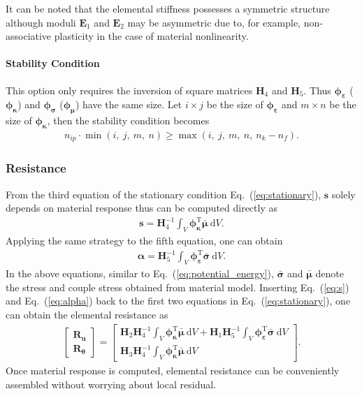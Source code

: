 \documentclass[3p,sort&compress,11pt,fleqn]{elsarticle}
\newcommand*{\eqsref}[1]{Eq.~(\ref{#1})}
\newcommand*{\mT}{\mathrm{T}}
\newcommand*{\md}[1]{\mathrm{d}#1}
\begin{document}
It can be noted that the elemental stiffness possesses a symmetric structure although moduli $\mathbold{E}_1$ and $\mathbold{E}_2$ may be asymmetric due to, for example, non-associative plasticity in the case of material nonlinearity.
\paragraph{Stability Condition}
This option only requires the inversion of square matrices $\mathbold{H}_4$ and $\mathbold{H}_5$. Thus $\mathbold{\phi}_\mathbold{\varepsilon}$ ($\mathbold{\phi}_\mathbold{\kappa}$) and $\mathbold{\phi}_\mathbold{\sigma}$ ($\mathbold{\phi}_\mathbold{\mu}$) have the same size. Let $i\times{}j$ be the size of $\mathbold{\phi}_\mathbold{\varepsilon}$ and $m\times{}n$ be the size of $\mathbold{\phi}_\mathbold{\kappa}$, then the stability condition becomes
\begin{gather}\label{eq:stability2}
n_{ip}\cdot{}\min\left(i,~j,~m,~n\right)\geqslant{}\max\left(i,~j,~m,~n,~n_k-n_f\right).
\end{gather}
\subsubsection{Resistance}
From the third equation of the stationary condition \eqsref{eq:stationary}, $\mathbold{s}$ solely depends on material response thus can be computed directly as
\begin{gather}\label{eq:s}
\mathbold{s}=\mathbold{H}_4^{-1}\int_V\mathbold{\phi}_\mathbold{\kappa}^\mT{}\bar{\mathbold{\mu}}~\md{V}.
\end{gather}
Applying the same strategy to the fifth equation, one can obtain
\begin{gather}\label{eq:alpha}
\mathbold{\alpha}=\mathbold{H}_5^{-1}\int_V\mathbold{\phi}_\mathbold{\varepsilon}^\mT{}\bar{\mathbold{\sigma}}~\md{V}.
\end{gather}
In the above equations, similar to \eqsref{eq:potential_energy}, $\bar{\mathbold{\sigma}}$ and $\bar{\mathbold{\mu}}$ denote the stress and couple stress obtained from material model. Inserting \eqsref{eq:s} and \eqsref{eq:alpha} back to the first two equations in \eqsref{eq:stationary}, one can obtain the elemental resistance as
\begin{gather}
\begin{bmatrix}
\mathbold{R}_\mathbold{u}\\\mathbold{R}_\mathbold{\theta}
\end{bmatrix}=\begin{bmatrix}
\displaystyle\mathbold{H}_2\mathbold{H}_4^{-1}\int_V\mathbold{\phi}_\mathbold{\kappa}^\mT{}\bar{\mathbold{\mu}}~\md{V}+\mathbold{H}_1\mathbold{H}_5^{-1}\int_V\mathbold{\phi}_\mathbold{\varepsilon}^\mT{}\bar{\mathbold{\sigma}}~\md{V}\\
\displaystyle\mathbold{H}_3\mathbold{H}_4^{-1}\int_V\mathbold{\phi}_\mathbold{\kappa}^\mT{}\bar{\mathbold{\mu}}~\md{V}
\end{bmatrix}.
\end{gather}
Once material response is computed, elemental resistance can be conveniently assembled without worrying about local residual.
\end{document}
